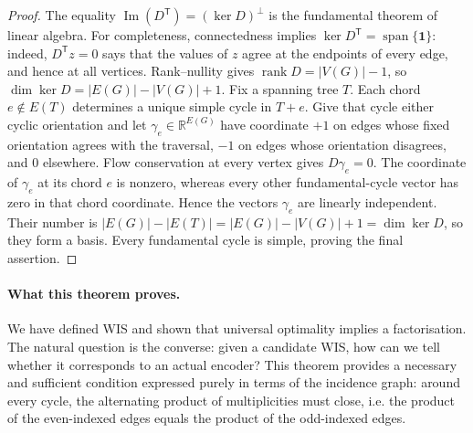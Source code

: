 \begin{proof}
The equality $\operatorname{Im}(D^{\mathsf T})=(\ker D)^\perp$ is the
fundamental theorem of linear algebra.  For completeness, connectedness
implies $\ker D^{\mathsf T}=\operatorname{span}\{\mathbf1\}$: indeed,
$D^{\mathsf T}z=0$ says that the values of $z$ agree at the endpoints
of every edge, and hence at all vertices.  Rank--nullity gives
$\operatorname{rank}D=|V(G)|-1$, so
$\dim\ker D=|E(G)|-|V(G)|+1.$
Fix a spanning tree $T$.  Each chord $e\notin E(T)$ determines a unique
simple cycle in $T+e$.  Give that cycle either cyclic orientation and
let $\gamma_e\in\mathbb R^{E(G)}$ have coordinate $+1$ on edges whose
fixed orientation agrees with the traversal, $-1$ on edges whose
orientation disagrees, and $0$ elsewhere.  Flow conservation at every
vertex gives $D\gamma_e=0$.  The coordinate of $\gamma_e$ at its chord
$e$ is nonzero, whereas every other fundamental-cycle vector has zero
in that chord coordinate.  Hence the vectors $\gamma_e$ are linearly
independent.  Their number is
$|E(G)|-|E(T)|=|E(G)|-|V(G)|+1=\dim\ker D$, so they form a basis.
Every fundamental cycle is simple, proving the final assertion.
\end{proof}

\paragraph{What this theorem proves.}
We have defined WIS and shown that universal optimality implies a factorisation.  The natural question is the converse: given a candidate WIS, how can we tell whether it corresponds to an actual encoder?  This theorem provides a necessary and sufficient condition expressed purely in terms of the incidence graph: around every cycle, the alternating product of multiplicities must close, i.e. the product of the even-indexed edges equals the product of the odd-indexed edges.

